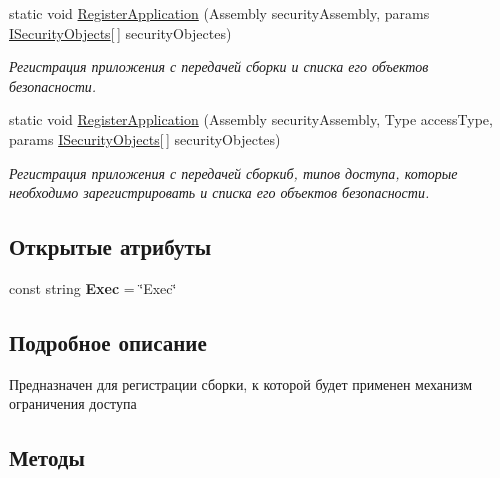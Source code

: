 \begin{DoxyCompactItemize}
static void \hyperlink{class_security_1_1_configurations_1_1_config_a78ec86a8de51d6bf724e3a2a63a2ad8f}{Register\+Application} (Assembly security\+Assembly, params \hyperlink{interface_security_1_1_interfaces_1_1_i_security_objects}{I\+Security\+Objects}\mbox{[}$\,$\mbox{]} security\+Objectes)
\begin{DoxyCompactList}\small\item\em Регистрация приложения с передачей сборки и списка его объектов безопасности. \end{DoxyCompactList}\item 
static void \hyperlink{class_security_1_1_configurations_1_1_config_a3678c65f12c9c31d2a1aa035e5432d60}{Register\+Application} (Assembly security\+Assembly, Type access\+Type, params \hyperlink{interface_security_1_1_interfaces_1_1_i_security_objects}{I\+Security\+Objects}\mbox{[}$\,$\mbox{]} security\+Objectes)
\begin{DoxyCompactList}\small\item\em Регистрация приложения с передачей сборкиб, типов доступа, которые необходимо зарегистрировать и списка его объектов безопасности. \end{DoxyCompactList}\end{DoxyCompactItemize}
\subsection*{Открытые атрибуты}
\begin{DoxyCompactItemize}
\item 
\mbox{\label{class_security_1_1_configurations_1_1_config_a772d1bb22322c96ac127ff25ff5344e0}} 
const string {\bfseries Exec} = \char`\"{}Exec\char`\"{}
\end{DoxyCompactItemize}


\subsection{Подробное описание}
Предназначен для регистрации сборки, к которой будет применен механизм ограничения доступа 



\subsection{Методы}
\mbox{\label{class_security_1_1_configurations_1_1_config_a4f0405cc257b3cd627c58d215aad3fdf}} 
